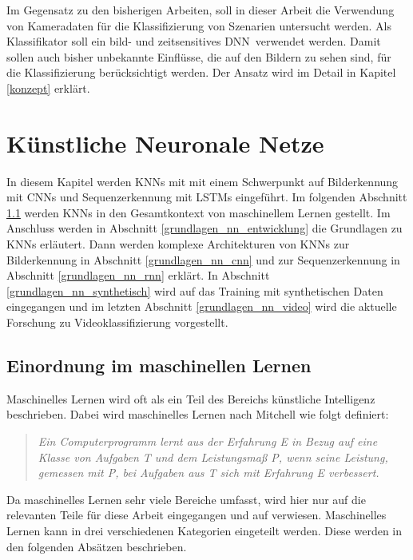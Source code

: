 Im Gegensatz zu den bisherigen Arbeiten, soll in dieser Arbeit die Verwendung von Kameradaten für die Klassifizierung von Szenarien untersucht werden. Als Klassifikator soll ein bild- und zeitsensitives \ac{DNN} verwendet werden. Damit sollen auch bisher unbekannte Einflüsse, die auf den Bildern zu sehen sind, für die Klassifizierung berücksichtigt werden. Der Ansatz wird im Detail in Kapitel \ref{konzept} erklärt.

\section{Künstliche Neuronale Netze}
\label{grundlagen_nn}

In diesem Kapitel werden \acp{KNN} mit mit einem Schwerpunkt auf Bilderkennung mit \acp{CNN} und Sequenzerkennung mit \acp{LSTM} eingeführt. Im folgenden Abschnitt \ref{grundlagen_nn_ml} werden \acp{KNN} in den Gesamtkontext von maschinellem Lernen gestellt. Im Anschluss werden in Abschnitt \ref{grundlagen_nn_entwicklung} die Grundlagen zu \acp{KNN} erläutert. Dann werden komplexe Architekturen von \acp{KNN} zur Bilderkennung in Abschnitt \ref{grundlagen_nn_cnn} und zur Sequenzerkennung in Abschnitt \ref{grundlagen_nn_rnn} erklärt. In Abschnitt \ref{grundlagen_nn_synthetisch} wird auf das Training mit synthetischen Daten eingegangen und im letzten Abschnitt \ref{grundlagen_nn_video} wird die aktuelle Forschung zu Videoklassifizierung vorgestellt.

\subsection{Einordnung im maschinellen Lernen}
\label{grundlagen_nn_ml}

Maschinelles Lernen wird oft als ein Teil des Bereichs künstliche Intelligenz beschrieben. Dabei wird maschinelles Lernen nach Mitchell \cite{mitchell1997machine} wie folgt definiert:

\begin{quote}
\textit{\glqq Ein Computerprogramm lernt aus der Erfahrung E in Bezug auf eine Klasse von Aufgaben T und dem Leistungsmaß P, wenn seine Leistung, gemessen mit P, bei Aufgaben aus T sich mit Erfahrung E verbessert.\grqq}
\end{quote}

Da maschinelles Lernen sehr viele Bereiche umfasst, wird hier nur auf die relevanten Teile für diese Arbeit eingegangen und auf \cite{mitchell1997machine} verwiesen. Maschinelles Lernen kann in drei verschiedenen Kategorien eingeteilt werden. Diese werden in den folgenden Absätzen beschrieben.

